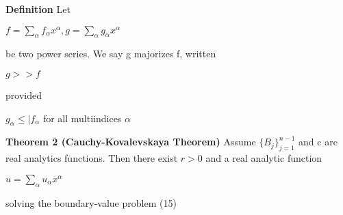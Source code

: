 \documentclass{article}
\newcommand\tab[1][1cm]{\hspace*{#1}}
\begin{document}
\textbf {Definition} Let 
\begin{center}
$f = \sum_{\alpha} f_{\alpha} x^{\alpha}, g = \sum_{\alpha} g_{\alpha}x^{\alpha}$
\end{center}
be two power series. We say g majorizes f, written
\begin{center}
$g >> f$
\end{center}
provided 
\begin{center}
$g_{\alpha} \leq |f_{\alpha}$ \tab for all multiindices $\alpha$
\end{center}

\textbf {Theorem 2 (Cauchy-Kovalevskaya Theorem)} Assume $\{B_j\}_{j=1}^{n-1}$ and c are real analytics functions. Then there exist $r > 0$ and a real analytic function
\begin{center}
$u = \sum_{\alpha}u_{\alpha}x^{\alpha}$
\end{center}
solving the boundary-value problem (15)
\end{document}
